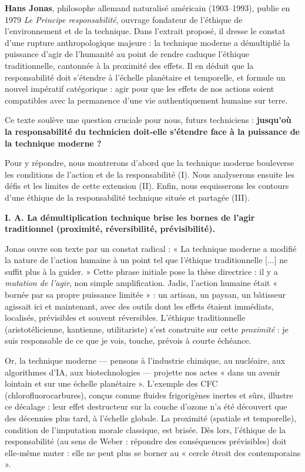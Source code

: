 \documentclass[11pt]{article}
\newcommand{\cle}[1]{{\popxbold\color{popdark}#1}}
\begin{document}
\begin{exoresolu}
\textbf{Hans Jonas}, philosophe allemand naturalisé américain (1903--1993), publie en 1979 \emph{Le Principe responsabilité}, ouvrage fondateur de l'éthique de l'environnement et de la technique. Dans l'extrait proposé, il dresse le constat d'une rupture anthropologique majeure : la technique moderne a démultiplié la puissance d'agir de l'humanité au point de rendre caduque l'éthique traditionnelle, cantonnée à la proximité des effets. Il en déduit que la responsabilité doit s'étendre à l'échelle planétaire et temporelle, et formule un nouvel impératif catégorique : agir pour que les effets de nos actions soient compatibles avec la permanence d'une vie authentiquement humaine sur terre.

Ce texte soulève une question cruciale pour nous, futurs techniciens : \textbf{jusqu'où la responsabilité du technicien doit-elle s'étendre face à la puissance de la technique moderne ?}

Pour y répondre, nous montrerons d'abord que la technique moderne bouleverse les conditions de l'action et de la responsabilité (I). Nous analyserons ensuite les défis et les limites de cette extension (II). Enfin, nous esquisserons les contours d'une éthique de la responsabilité technique située et partagée (III).
\end{exoresolu}

\begin{exoresolu}
\textbf{I. A. La démultiplication technique brise les bornes de l'agir traditionnel (proximité, réversibilité, prévisibilité).}

Jonas ouvre son texte par un constat radical : « La technique moderne a modifié la nature de l'action humaine à un point tel que l'éthique traditionnelle [...] ne suffit plus à la guider. » Cette phrase initiale pose la thèse directrice : il y a \emph{mutation de l'agir}, non simple amplification. Jadis, l'action humaine était « bornée par sa propre puissance limitée » : un artisan, un paysan, un bâtisseur agissait ici et maintenant, avec des outils dont les effets étaient immédiats, localisés, prévisibles et souvent réversibles. L'éthique traditionnelle (aristotélicienne, kantienne, utilitariste) s'est construite sur cette \emph{proximité} : je suis responsable de ce que je vois, touche, prévois à courte échéance.

Or, la technique moderne — pensons à l'industrie chimique, au nucléaire, aux algorithmes d'IA, aux biotechnologies — projette nos actes « dans un avenir lointain et sur une échelle planétaire ». L'exemple des CFC (chlorofluorocarbures), conçus comme fluides frigorigènes inertes et sûrs, illustre ce décalage : leur effet destructeur sur la couche d'ozone n'a été découvert que des décennies plus tard, à l'échelle globale. La \cle{proximité} (spatiale et temporelle), condition de l'imputation morale classique, est brisée. Dès lors, l'éthique de la responsabilité (au sens de Weber : répondre des conséquences prévisibles) doit elle-même muter : elle ne peut plus se borner au « cercle étroit des contemporains ».
\end{exoresolu}
\end{document}
